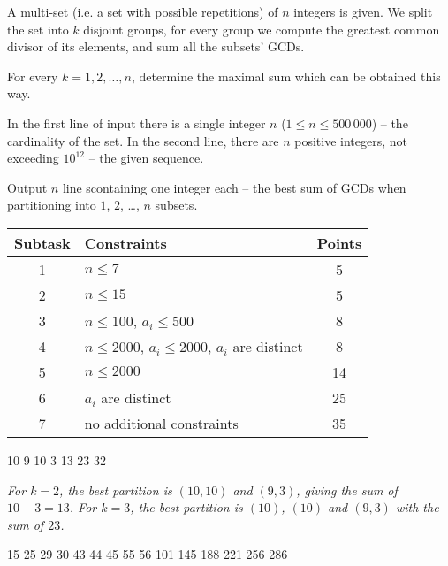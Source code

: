 










A multi-set (i.e. a set with possible repetitions) of $n$ integers is given. We split the set into $k$ disjoint groups, for every group we compute the greatest common divisor of its elements, and sum all the subsets' GCDs.

For every $k = 1, 2, \ldots, n$, determine the maximal sum which can be obtained this way.


In the first line of input there is a single integer $n$ ($1 \leq n \leq 500\,000$) -- the cardinality of the set. In the second line, there are $n$ positive integers, not exceeding $10^{12}$ -- the given sequence.


Output $n$ line scontaining one integer each -- the best sum of GCDs when partitioning into $1$, $2$, \ldots, $n$ subsets.


\begin{center}
  \begin{tabular}{|c|p{8cm}|c|}
    \hline
    \textbf{Subtask} & \textbf{Constraints} & \textbf{Points} \\ \hline
    1 & $n \leq 7$ & 5 \\ \hline
    2 & $n \leq 15$ & 5 \\ \hline
    3 & $n \leq 100$, $a_i \leq 500$ & 8 \\ \hline
    4 & $n \leq 2000$, $a_i \leq 2000$, $a_i$ are distinct & 8 \\ \hline
    5 & $n \leq 2000$ & 14 \\ \hline
    6 & $a_i$ are distinct & 25 \\ \hline
    7 & no additional constraints & 35 \\ \hline
  \end{tabular}
\end{center}

10 9 10 3
13
23
32

\sampleEND

\noindent \textit{For $k = 2$, the best partition is $(10,10)$ and $(9,3)$, giving the sum of $10+3 = 13$. For $k=3$, the best partition is $(10)$, $(10)$ and $(9,3)$ with the sum of $23$.}

\medskip

15 25 29 30 43 44 45 55
56
101
145
188
221
256
286

\sampleEND




